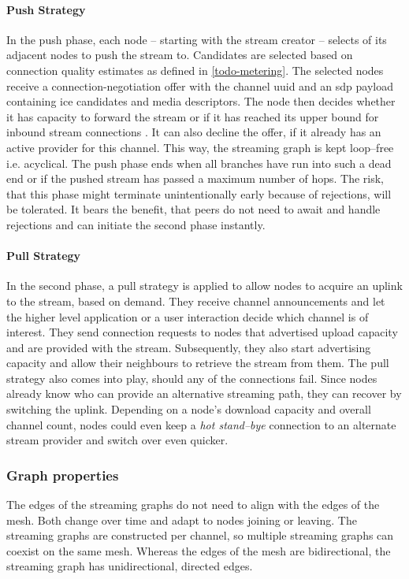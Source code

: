 \paragraph{Push Strategy}\label{par:design-stream-construction-push}
In the push phase, each node – starting with the stream creator – selects \outStreamConnections of its adjacent nodes to push the stream to. Candidates are selected based on connection quality estimates as defined in \ref{todo-metering}. The selected nodes receive a \gls{connection-negotiation} offer with the channel \gls{uuid} and an \gls{sdp} payload containing \gls{ice} candidates and media descriptors. The node then decides whether it has capacity to forward the stream or if it has reached its upper bound for inbound stream connections \inStreamConnections. It can also decline the offer, if it already has an active provider for this channel. This way, the streaming graph is kept loop–free i.e. acyclical. The push phase ends when all branches have run into such a dead end or if the pushed stream has passed a maximum number of hops. The risk, that this phase might terminate unintentionally early because of rejections, will be tolerated. It bears the benefit, that peers do not need to await and handle rejections and can initiate the second phase instantly.

\paragraph{Pull Strategy}\label{par:design-stream-construction-pull}
In the second phase, a pull strategy is applied to allow nodes to acquire an uplink to the stream, based on demand. They receive channel announcements and let the higher level application or a user interaction decide which channel is of interest. They send connection requests to nodes that advertised upload capacity and are provided with the stream. Subsequently, they also start advertising capacity and allow their neighbours to retrieve the stream from them. The pull strategy also comes into play, should any of the connections fail. Since nodes already know who can provide an alternative streaming path, they can recover by switching the uplink. Depending on a node's download capacity and overall channel count, nodes could even keep a \textit{hot stand–bye} connection to an alternate stream provider and switch over even quicker.


\subsubsection{Graph properties}\label{sec:design-stream-graph}

The edges of the streaming graphs do not need to align with the edges of the mesh. Both change over time and adapt to nodes joining or leaving. The streaming graphs are constructed per channel, so multiple streaming graphs can coexist on the same mesh. Whereas the edges of the mesh are bidirectional, the streaming graph has unidirectional, directed edges.
